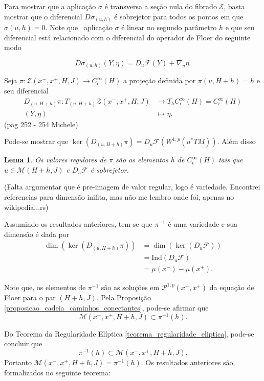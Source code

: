 \documentclass[12pt]{book}
\newtheorem{lema}[teorema]{Lema}
\newcommand{\caminhosexponenciaisconectantes}[2]{\mathcal{P}^{1,p}(#1, #2)}
\newcommand{\caminhosexponenciaisconectantespadrao}{\caminhosexponenciaisconectantes{x^{-}}{x^{+}}}
\newcommand{\diferencialfloerponto}[1]{D_{#1}\operadorFloer}
\newcommand{\energiafinitaM}{\mathcal{M}}
\newcommand{\energiafinitaMconectanteHamiltoniana}{\energiafinitaM(x^{-}, x^{+},H+h,J)}
\newcommand{\espacosobolev}[1]{W^{1,p}(#1)}
\newcommand{\ind}{\text{Ind}}
\newcommand{\operadorFloer}{\mathcal{F}}
\newcommand{\orbitasConectantesZ}{\mathcal{Z}(x^{-}, x^{+},H, J)}
\newcommand{\perturbacaoHamiltoniana}[1]{C^{\infty}_{\epsilon}(#1)}
\newcommand{\pullbackfibradotangente}[2]{#1^{*}T#2}
\newcommand{\pullbackfibradotangenteM}[1]{\pullbackfibradotangente{#1}{M}}
\newcommand{\aviso}[1]{{\color{violet}(#1)}}
\newcommand{\alerta}[1]{{\color{red}#1}}
\begin{document}
	Para mostrar que a aplicação $\sigma$ é transversa a seção nula do fibrado $\mathcal{E}$, basta mostrar que o diferencial $D\sigma_{(u,h)}$ é sobrejetor para todos os pontos em que $\sigma(u,h) = 0$. Note que \ aplicação $\sigma$ é linear no segundo parâmetro $h$ e que seu diferencial está relacionado com o diferencial do operador de Floer do seguinte modo
	
	$$
	D\sigma_{(u,h)}(Y,\eta) = \diferencialfloerponto{u}(Y)+\nabla_{u}\eta.
	$$
	
	Seja $\pi:\orbitasConectantesZ \to \perturbacaoHamiltoniana{H}$ a projeção definida por $\pi(u, H+h) = h$ e seu diferencial
	$$
	\begin{aligned}
	D_{(u,H+h)}\pi: T_{(u,H+h)}\orbitasConectantesZ 
	&\to T_{h}\perturbacaoHamiltoniana{H}=\perturbacaoHamiltoniana{H}
	\\
	(Y,\eta) &\mapsto \eta.
	\end{aligned}
	$$
	\aviso{pag 252 - 254 Michele}
	
	Pode-se mostrar que $
	\ker(D_{(u,H+h)}\pi)=\diferencialfloerponto{u}(\espacosobolev{\pullbackfibradotangenteM{u}})$. Além disso 
	\begin{lema}
		Os valores regulares de $\pi$ são os elementos $h$ de $\perturbacaoHamiltoniana{H}$ tais que $u\in \energiafinitaM(H+h, J)$ e $\diferencialfloerponto{u}$ é sobrejetor.
	\end{lema}
	
	\alerta{(Falta argumentar que é pre-imagem de valor regular, logo é variedade. Encontrei referencias para dimensão inifita, mas não me lembro onde foi, apenas no wikipedia...rs)}
	
	Assumindo os resultados anteriores, tem-se que $\pi^{-1}$ é uma variedade e sua dimensão é dada por
	$$
	\begin{aligned}
	\dim(\ker(D_{(u, H+h)}\pi)) &= \dim(\ker(\diferencialfloerponto{u}))
	\\
	&=\ind{(\diferencialfloerponto{u})}
	\\
	&=\mu(x^{-})-\mu(x^{+}).
	\end{aligned}
	$$
	
	Note que, os elementos de $\pi^{-1}$ são as soluções em $\caminhosexponenciaisconectantespadrao$ da equação de Floer para o par $(H+h, J)$. Pela Proposição \ref{proposicao_cadeia_caminhos_conectantes}, pode-se afirmar que 
	$$
	\energiafinitaMconectanteHamiltoniana \subset\pi^{-1}(h).
	$$
	
	Do Teorema da Regularidade Elíptica \ref{teorema_regularidade_eliptica}, pode-se concluir que 
	$$
	\pi^{-1}(h) \subset\energiafinitaMconectanteHamiltoniana.
	$$
	Portanto $\energiafinitaMconectanteHamiltoniana =\pi^{-1}(h)$. Os resultados anteriores são formalizados no seguinte teorema:
	
\end{document}
